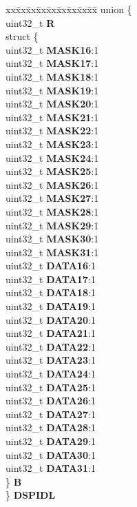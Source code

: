 \begin{DoxyCompactItemize}
\begin{tabbing}
\end{tabbing}\item 
\mbox{\label{structSIU__tag_afc9cb16a6ddcbf137d17e28e6db8e76e}} 
\begin{tabbing}
xx\=xx\=xx\=xx\=xx\=xx\=xx\=xx\=xx\=\kill
union \{\\
\>uint32\_t {\bfseries R}\\
\>struct \{\\
\>\>uint32\_t {\bfseries MASK16}:1\\
\>\>uint32\_t {\bfseries MASK17}:1\\
\>\>uint32\_t {\bfseries MASK18}:1\\
\>\>uint32\_t {\bfseries MASK19}:1\\
\>\>uint32\_t {\bfseries MASK20}:1\\
\>\>uint32\_t {\bfseries MASK21}:1\\
\>\>uint32\_t {\bfseries MASK22}:1\\
\>\>uint32\_t {\bfseries MASK23}:1\\
\>\>uint32\_t {\bfseries MASK24}:1\\
\>\>uint32\_t {\bfseries MASK25}:1\\
\>\>uint32\_t {\bfseries MASK26}:1\\
\>\>uint32\_t {\bfseries MASK27}:1\\
\>\>uint32\_t {\bfseries MASK28}:1\\
\>\>uint32\_t {\bfseries MASK29}:1\\
\>\>uint32\_t {\bfseries MASK30}:1\\
\>\>uint32\_t {\bfseries MASK31}:1\\
\>\>uint32\_t {\bfseries DATA16}:1\\
\>\>uint32\_t {\bfseries DATA17}:1\\
\>\>uint32\_t {\bfseries DATA18}:1\\
\>\>uint32\_t {\bfseries DATA19}:1\\
\>\>uint32\_t {\bfseries DATA20}:1\\
\>\>uint32\_t {\bfseries DATA21}:1\\
\>\>uint32\_t {\bfseries DATA22}:1\\
\>\>uint32\_t {\bfseries DATA23}:1\\
\>\>uint32\_t {\bfseries DATA24}:1\\
\>\>uint32\_t {\bfseries DATA25}:1\\
\>\>uint32\_t {\bfseries DATA26}:1\\
\>\>uint32\_t {\bfseries DATA27}:1\\
\>\>uint32\_t {\bfseries DATA28}:1\\
\>\>uint32\_t {\bfseries DATA29}:1\\
\>\>uint32\_t {\bfseries DATA30}:1\\
\>\>uint32\_t {\bfseries DATA31}:1\\
\>\} {\bfseries B}\\
\} {\bfseries DSPIDL}\\


\end{tabbing}
\end{DoxyCompactItemize}
